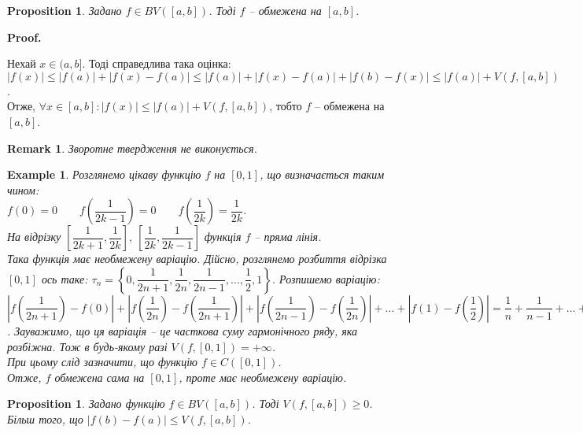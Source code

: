 \documentclass[a4paper, 10pt]{article}
\makeatletter
\def\qed{$\blacksquare$}
\theoremstyle{theoremdd}
\theoremstyle{theoremdd}
\theoremstyle{theoremdd}
\theoremstyle{theoremdd}
\theoremstyle{theoremdd}
\newtheorem{example}[theorem]{Example}
\theoremstyle{theoremdd}
\newtheorem{proposition}[theorem]{Proposition}
\theoremstyle{theoremdd}
\newtheorem{remark}[theorem]{Remark}
\theoremstyle{theoremdd}
\theoremstyle{theoremdd}
\renewenvironment{proof}[1][Proof.\\]{\par
\pushQED{\hfill \qed}%
\normalfont \topsep6\p@\@plus6\p@\relax
\trivlist
\item\relax
{\bfseries
#1\@addpunct{.}}\hspace\labelsep\ignorespaces
}{%
\popQED\endtrivlist\@endpefalse
}
\makeatother
\begin{document}
\begin{proposition}
Задано $f \in BV([a,b])$. Тоді $f$ -- обмежена на $[a,b]$. 
\end{proposition}

\begin{proof}
Нехай $x \in (a,b]$. Тоді справедлива така оцінка:\\
$|f(x)| \leq |f(a)| + |f(x) - f(a)| \leq |f(a)| + |f(x) - f(a)| + |f(b) - f(x)| \leq |f(a)| + V(f,[a,b])$.\\
Отже, $\forall x \in [a,b]: |f(x)| \leq |f(a)| + V(f,[a,b])$, тобто $f$ -- обмежена на $[a,b]$.
\end{proof}

\begin{remark}
Зворотне твердження не виконується.
\end{remark}

\begin{example}
Розглянемо цікаву функцію $f$ на $[0,1]$, що визначається таким чином:\\
$f(0) = 0 \qquad f\left(\dfrac{1}{2k-1}\right) = 0 \qquad f\left(\dfrac{1}{2k}\right) = \dfrac{1}{2k}$.\\
На відрізку $\left[ \dfrac{1}{2k+1}, \dfrac{1}{2k} \right],\ \left[ \dfrac{1}{2k}, \dfrac{1}{2k-1}\right]$ функція $f$ -- пряма лінія.\\
Така функція має необмежену варіацію. Дійсно, розглянемо розбиття відрізка $[0,1]$ ось таке: $\tau_n = \left\{ 0, \dfrac{1}{2n+1}, \dfrac{1}{2n},\dfrac{1}{2n-1}, \dots,\dfrac{1}{2},1 \right\}$. Розпишемо варіацію:\\
$\displaystyle\left| f\left(\dfrac{1}{2n+1}\right) - f(0) \right| + \left| f\left(\dfrac{1}{2n}\right) - f\left(\dfrac{1}{2n+1}\right) \right| + \left| f\left(\dfrac{1}{2n-1}\right) - f\left(\dfrac{1}{2n}\right) \right| + \dots + \left| f\left(1\right) - f\left(\dfrac{1}{2}\right) \right| = \dfrac{1}{n} + \dfrac{1}{n-1} + \dots + 1$. Зауважимо, що ця варіація -- це часткова суму гармонічного ряду, яка розбіжна. Тож в будь-якому разі $V(f,[0,1]) = +\infty$.\\
При цьому слід зазначити, що функцію $f \in C([0,1])$.\\
Отже, $f$ обмежена сама на $[0,1]$, проте має необмежену варіацію.
\end{example}

\begin{proposition}
Задано функцію $f \in BV([a,b])$. Тоді $V(f,[a,b]) \geq 0$. Більш того, що $|f(b) - f(a)| \leq V(f,[a,b])$.
\end{proposition}
\end{document}
